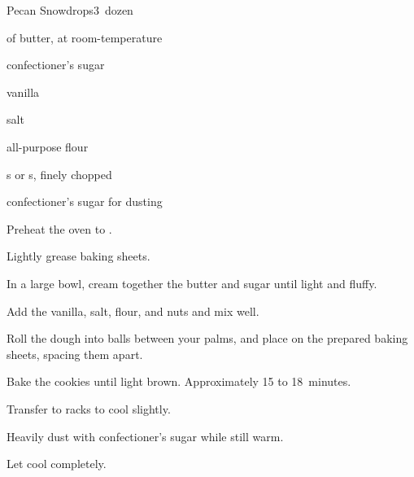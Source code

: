 \begin{recipe}{Pecan Snowdrops}{}{3~dozen}

\begin{ingredients}
\item \C{\threequarter} of butter, at room-temperature
\item \C{\third} confectioner's sugar
\item {} vanilla
\item \tp{\eighth} salt
\item \C{1\half} all-purpose flour
\item \C{\threequarter} s or s, finely chopped
\item confectioner's sugar for dusting
\end{ingredients}

\begin{directions}
\item Preheat the oven to .
\item Lightly grease baking sheets.
\item In a large bowl, cream together the butter and sugar until light and fluffy.
\item Add the vanilla, salt, flour, and nuts and mix well.
\item Roll the dough into \inch{\threequarter} balls between your palms, and place on the prepared baking sheets, spacing them \inch{1\half} apart.
\item Bake the cookies until light brown. Approximately 15 to 18~minutes.
\item Transfer to racks to cool slightly.
\item Heavily dust with confectioner's sugar while still warm.
\item Let cool completely.
\end{directions}

\end{recipe}
